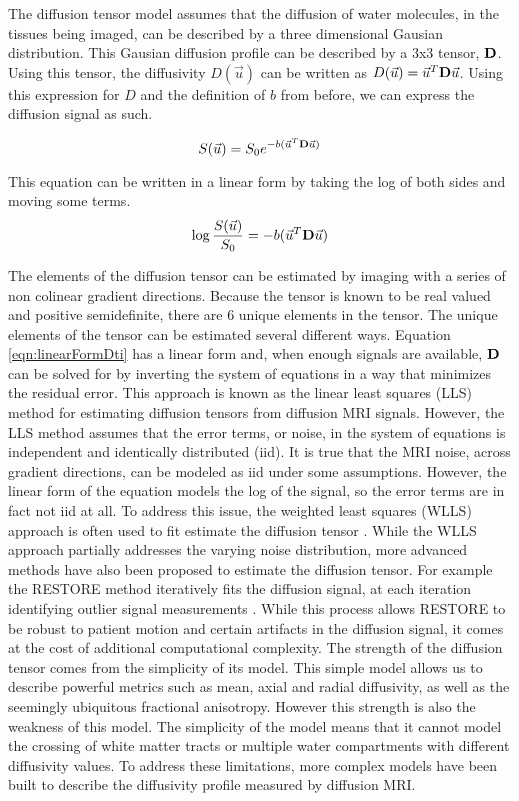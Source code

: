     The diffusion tensor model assumes that the diffusion of water molecules, in the tissues being imaged, can be described by a three dimensional Gausian distribution. This Gausian diffusion profile can be described by a 3x3 tensor, $\bold{D}$. Using this tensor, the diffusivity $D(\vec{u})$ can be written as $D(\vec{u}) = \vec{u}^T \bold{D} \vec{u}$. Using this expression for $D$ and the definition of $b$ from before, we can express the diffusion signal as such.
    
\begin{equation}
S(\vec{u}) = S_0 e^{-b (\vec{u}^T \bold{D} \vec{u})}
\end{equation}

This equation can be written in a linear form by taking the log of both sides and moving some terms.
\begin{equation}
\label{eqn:linearFormDti}
\log{\frac{S(\vec{u})}{S_0}} = -b (\vec{u}^T \bold{D} \vec{u})
\end{equation}

The elements of the diffusion tensor can be estimated by imaging with a series of non colinear gradient directions. Because the tensor is known to be real valued and positive semidefinite, there are 6 unique elements in the tensor. The unique elements of the tensor can be estimated several different ways. Equation \ref{eqn:linearFormDti} has a linear form and, when enough signals are available, $\bold{D}$ can be solved for by inverting the system of equations in a way that minimizes the residual error. This approach is known as the linear least squares (LLS) method for estimating diffusion tensors from diffusion MRI signals. However, the LLS method assumes that the error terms, or noise, in the system of equations is independent and identically distributed (iid). It is true that the MRI noise, across gradient directions, can be modeled as iid under some assumptions. However, the linear form of the equation models the log of the signal, so the error terms are in fact not iid at all. To address this issue, the weighted least squares (WLLS) approach is often used to fit estimate the diffusion tensor \cite{Jones_2010}. While the WLLS approach partially addresses the varying noise distribution, more advanced methods have also been proposed to estimate the diffusion tensor. For example the RESTORE method iteratively fits the diffusion signal, at each iteration identifying outlier signal measurements \cite{Chang_2005}. While this process allows RESTORE to be robust to patient motion and certain artifacts in the diffusion signal, it comes at the cost of additional computational complexity. The strength of the diffusion tensor comes from the simplicity of its model. This simple model allows us to describe powerful metrics such as mean, axial and radial diffusivity, as well as the seemingly ubiquitous fractional anisotropy. However this strength is also the weakness of this model. The simplicity of the model means that it cannot model the crossing of white matter tracts or multiple water compartments with different diffusivity values. To address these limitations, more complex models have been built to describe the diffusivity profile measured by diffusion MRI.